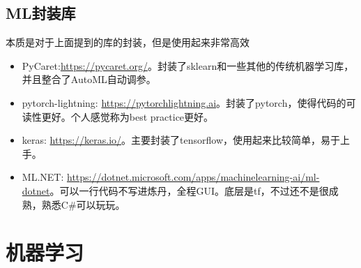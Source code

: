 \documentclass[lang=cn,11pt,a4paper]{elegant_template}
\begin{document}
\subsection{ML封装库}
本质是对于上面提到的库的封装，但是使用起来非常高效
\begin{itemize}
    \item PyCaret:\href{https://pycaret.org/}{https://pycaret.org/}。封装了sklearn和一些其他的传统机器学习库，并且整合了AutoML自动调参。
    \item pytorch-lightning: \href{https://pytorchlightning.ai}{https://pytorchlightning.ai}。封装了pytorch，使得代码的可读性更好。个人感觉称为best practice更好。
    \item keras: \href{https://keras.io/}{https://keras.io/}。主要封装了tensorflow，使用起来比较简单，易于上手。
    \item ML.NET: 
    \href{https://dotnet.microsoft.com/apps/machinelearning-ai/ml-dotnet}{https://dotnet.microsoft.com/apps/machinelearning-ai/ml-dotnet}。可以一行代码不写进炼丹，全程GUI。底层是tf，不过还不是很成熟，熟悉C\#可以玩玩。
\end{itemize}

\section{机器学习}
\end{document}
